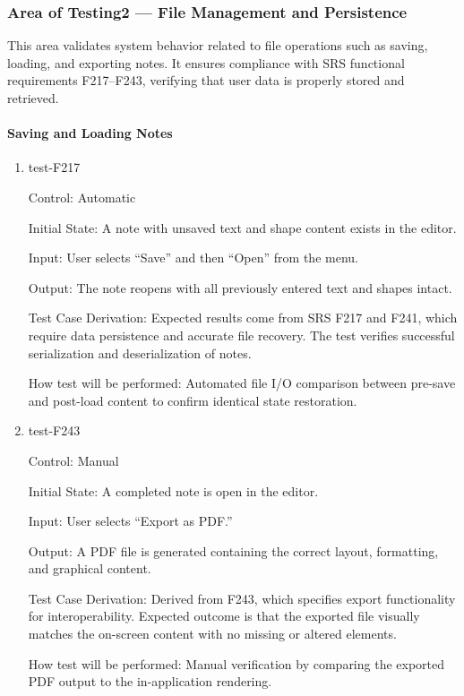 \documentclass[12pt, titlepage]{article}
\begin{document}
\subsubsection{Area of Testing2 — File Management and Persistence}

This area validates system behavior related to file operations such as saving, loading, and exporting notes.
It ensures compliance with SRS functional requirements F217–F243, verifying that user data is properly stored and retrieved.

\paragraph{Saving and Loading Notes}

\begin{enumerate}

\item{test-F217\\}

Control: Automatic

Initial State: A note with unsaved text and shape content exists in the editor.

Input: User selects “Save” and then “Open” from the menu.

Output: The note reopens with all previously entered text and shapes intact.

Test Case Derivation: Expected results come from SRS F217 and F241, which require data persistence and accurate file recovery.
The test verifies successful serialization and deserialization of notes.

How test will be performed: Automated file I/O comparison between pre-save and post-load content to confirm identical state restoration.

\item{test-F243\\}

Control: Manual

Initial State: A completed note is open in the editor.

Input: User selects “Export as PDF.”

Output: A PDF file is generated containing the correct layout, formatting, and graphical content.

Test Case Derivation: Derived from F243, which specifies export functionality for interoperability.
Expected outcome is that the exported file visually matches the on-screen content with no missing or altered elements.

How test will be performed: Manual verification by comparing the exported PDF output to the in-application rendering.

\end{enumerate}
\end{document}
